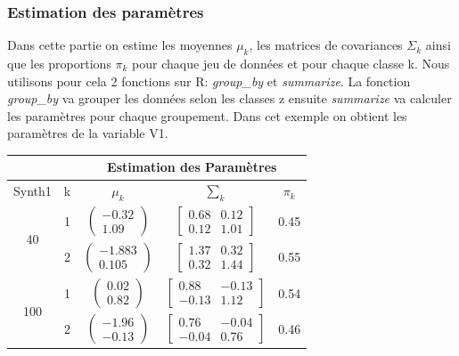 \documentclass[10pt]{article}
\begin{document}
			\subsubsection{Estimation des paramètres}
			Dans cette partie on estime les moyennes $\mu_{k}$, les matrices de covariances $\Sigma_{k}$ ainsi que les proportions $\pi_{k}$ pour chaque jeu de données et pour chaque classe k. Nous utilisons pour cela 2 fonctions sur R: \textit{group\_by} et \textit{summarize}. La fonction \textit{group\_by} va grouper les données selon les classes z ensuite \textit{summarize} va calculer les paramètres pour chaque groupement. Dans cet exemple on obtient les paramètres de la variable V1.
			\begin{center}		
			\begin{tabular}{ | c | c | c | c | c |}
				\rowcolor{lightgray}
			& &  \multicolumn{3}{c|}{Estimation des Paramètres} \\
			\hline
			 Synth1 & k & $\mu_{k}$ & $\sum_{k}$ & $\pi_{k} $\\
			\hline
			\multirow{2}{*}{40}       &   1&     $\begin{pmatrix} -0.32\\1.09 \end{pmatrix}$                 &     $\begin{bmatrix} 0.68 & 0.12 \\ 0.12 & 1.01 \end{bmatrix}$      & 	0.45				\\\cline{2-5}
			
			      									        &   2&      $\begin{pmatrix} -1.883\\0.105 \end{pmatrix}$          &         $\begin{bmatrix} 1.37 & 0.32 \\ 0.32 &1.44 \end{bmatrix}$        & 			0.55  		\\  
			      									         
			\hline
			\hline
			\multirow{2}{*}{100}      &   1&    $\begin{pmatrix} 0.02\\0.82 \end{pmatrix}$              &           $\begin{bmatrix} 0.88 & -0.13 \\ -0.13 & 1.12 \end{bmatrix}$      & 		0.54	   \\\cline{2-5}
			      											
			      											 &   2&        $\begin{pmatrix} -1.96\\-0.13 \end{pmatrix}$          &         $\begin{bmatrix} 0.76 & -0.04 \\ -0.04 & 0.76 \end{bmatrix}$               & 			0.46		\\
		\hline
		\end{tabular} 
	\end{center}
\end{document}
